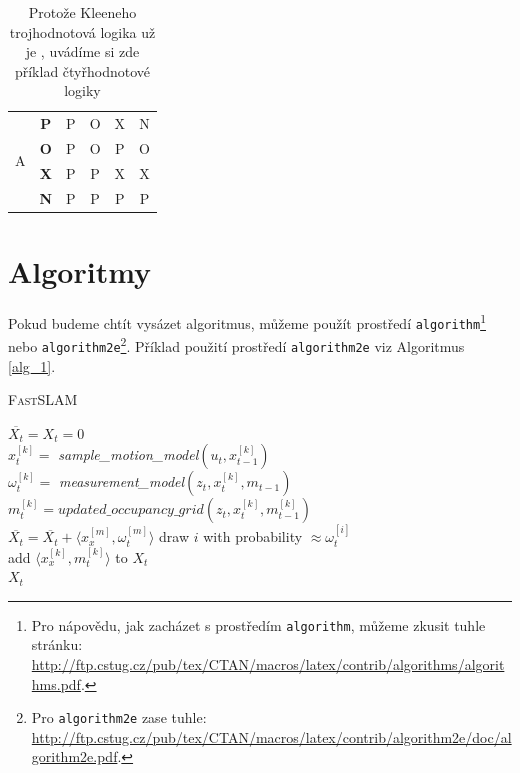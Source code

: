 \documentclass[11pt, a4paper]{article}
\begin{document}
\begin{table}[h]
\begin{center}
\begin{tabular}{|c|c|c|c|c|c|}
        \hline
        \multirow{4}{*}{A} & \textbf{P} & P & O & X & N \\
        \cline{2-6}
        & \textbf{O} & P & O & P & O \\
        \cline{2-6}
        & \textbf{X} & P & P & X & X \\
        \cline{2-6}
        & \textbf{N} & P & P & P & P \\
        \hline
    \end{tabular}
    \end{center}
    \caption{Protože Kleeneho trojhodnotová logika už je , uvádíme si zde příklad čtyřhodnotové logiky}\label{tab_2}
\end{table}

\newpage
\section{Algoritmy} \label{sekce_3}
Pokud budeme chtít vysázet algoritmus, můžeme použít prostředí \verb|algorithm|\footnote{Pro nápovědu, jak zacházet s prostředím \texttt{algorithm}, můžeme zkusit tuhle stránku: \\\url{http://ftp.cstug.cz/pub/tex/CTAN/macros/latex/contrib/algorithms/algorithms.pdf}.} nebo \;\verb|algorithm2e|\;\footnote{Pro \texttt{algorithm2e} zase tuhle: \url{http://ftp.cstug.cz/pub/tex/CTAN/macros/latex/contrib/algorithm2e/doc/algorithm2e.pdf}.}. Příklad použití prostředí \;\verb|algorithm2e|\; viz Algoritmus \ref{alg_1}. 

\begin{algorithm}[h]
    \SetAlgoNoLine
    \SetNlSkip{-1.5em}
    \caption{\textsc{Fast}SLAM} \label{alg_1}
    \BlankLine
    \Indp\Indpp
    $\overline{X_t} = X_t = 0$\\
    {
    \Indpp
    $x_t^{[k]} =$ \emph{sample\_motion\_model}$(u_t,x_{t-1}^{[k]})$\\
    $\omega_t^{[k]} =$ \emph{measurement\_model}$(z_t,x_t^{[k]},m_{t-1})$\\
    $m_t^{[k]} = updated\_occupancy\_grid(z_t,x_t^{[k]},m_{t-1}^{[k]})$\\
    $\overline{X_t} = \overline{X_t} + \langle x_x^{[m]}, \omega_t^{[m]}\rangle$
    }
    {
    \Indpp draw $i$ with probability $\approx \omega_t^{[i]}$\\
    add $\langle x_x^{[k]}, m_t^{[k]}\rangle$ to $X_t$\\
    }
    \Return $X_t$
\end{algorithm}
\end{document}
